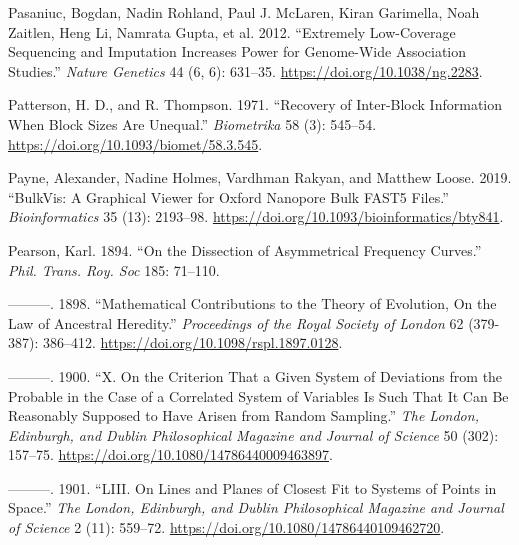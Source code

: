 \documentclass[
]{book}
\newlength{\cslhangindent}
\newlength{\cslentryspacingunit} %
\newenvironment{CSLReferences}[2] %
 {%
  \setlength{\parindent}{0pt}
  \ifodd #1
  \let\oldpar\par
  \def\par{\hangindent=\cslhangindent\oldpar}
  \fi
  \setlength{\parskip}{#2\cslentryspacingunit}
 }%
 {}
\begin{document}
\begin{CSLReferences}{1}{0}
\leavevmode{}%
Pasaniuc, Bogdan, Nadin Rohland, Paul J. McLaren, Kiran Garimella, Noah Zaitlen, Heng Li, Namrata Gupta, et al. 2012. {``Extremely Low-Coverage Sequencing and Imputation Increases Power for Genome-Wide Association Studies.''} \emph{Nature Genetics} 44 (6, 6): 631--35. \url{https://doi.org/10.1038/ng.2283}.

\leavevmode{}%
Patterson, H. D., and R. Thompson. 1971. {``Recovery of Inter-Block Information When Block Sizes Are Unequal.''} \emph{Biometrika} 58 (3): 545--54. \url{https://doi.org/10.1093/biomet/58.3.545}.

\leavevmode{}%
Payne, Alexander, Nadine Holmes, Vardhman Rakyan, and Matthew Loose. 2019. {``{BulkVis}: A Graphical Viewer for {Oxford} Nanopore Bulk {FAST5} Files.''} \emph{Bioinformatics} 35 (13): 2193--98. \url{https://doi.org/10.1093/bioinformatics/bty841}.

\leavevmode{}%
Pearson, Karl. 1894. {``On the Dissection of Asymmetrical Frequency Curves.''} \emph{Phil. Trans. Roy. Soc} 185: 71--110.

\leavevmode{}%
---------. 1898. {``Mathematical Contributions to the Theory of Evolution, {On} the Law of Ancestral Heredity.''} \emph{Proceedings of the Royal Society of London} 62 (379-387): 386--412. \url{https://doi.org/10.1098/rspl.1897.0128}.

\leavevmode{}%
---------. 1900. {``X. {On} the Criterion That a Given System of Deviations from the Probable in the Case of a Correlated System of Variables Is Such That It Can Be Reasonably Supposed to Have Arisen from Random Sampling.''} \emph{The London, Edinburgh, and Dublin Philosophical Magazine and Journal of Science} 50 (302): 157--75. \url{https://doi.org/10.1080/14786440009463897}.

\leavevmode{}%
---------. 1901. {``{LIII}. {On} Lines and Planes of Closest Fit to Systems of Points in Space.''} \emph{The London, Edinburgh, and Dublin Philosophical Magazine and Journal of Science} 2 (11): 559--72. \url{https://doi.org/10.1080/14786440109462720}.


\end{CSLReferences}
\end{document}
